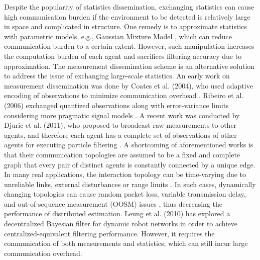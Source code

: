 	Despite the popularity of statistics dissemination, exchanging statistics can cause high communication burden if the environment to be detected is relatively large in space and complicated in structure. 
	One remedy is to approximate statistics with parametric models, e.g., Gaussian Mixture Model \cite{sheng2005distributed}, which can reduce communication burden to a certain extent. 
	However, such manipulation increases the computation burden of each agent and sacrifices filtering  accuracy due to approximation.
	The measurement dissemination scheme is an alternative solution to address the issue of exchanging large-scale statistics. 
	An early work on measurement dissemination was done by Coates et al. (2004), who used adaptive encoding of observations to minimize communication overhead \cite{coates2004distributed}. Ribeiro et al. (2006) exchanged quantized observations along with error-variance limits considering more pragmatic signal models \cite{ribeiro2006bandwidth}.
	A recent work was conducted by Djuric et al. (2011), who proposed to broadcast raw measurements to other agents, and therefore each agent has a complete set of observations of other agents for executing particle filtering \cite{djuric2011non}.  
	A shortcoming of aforementioned works is that their communication topologies are assumed to be a fixed and complete graph that every pair of distinct agents is constantly connected by a unique edge. 
	In many real applications, the interaction topology can be time-varying due to unreliable links, external disturbances or range limits \cite{xiao2008asynchronous,gao2016robust}.
	In such cases, dynamically changing topologies can cause random packet loss, variable transmission delay, and out-of-sequence measurement (OOSM) issues \cite{xia2009networked}, thus decreasing the performance of distributed estimation.
	Leung et al. (2010) has explored a decentralized Bayesian filter for dynamic robot networks \cite{leung2010decentralized} in order to achieve centralized-equivalent filtering performance.
	However, it requires the communication of both measurements and statistics, which can still incur large communication overhead.
	
